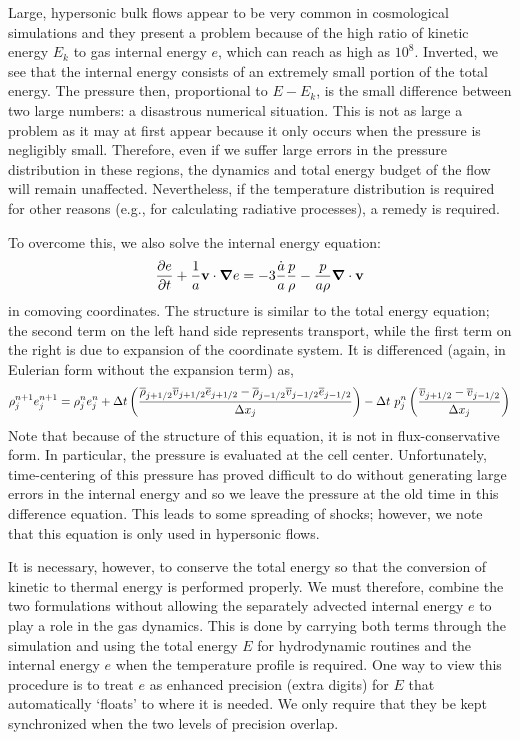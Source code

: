 Large, hypersonic bulk flows appear to be very common in cosmological
simulations and they present a problem because of the high ratio of
kinetic energy $E_k$ to gas internal energy $e$, which can reach as
high as $10^8$.  Inverted, we see that the internal energy consists of
an extremely small portion of the total energy.  The pressure then,
proportional to $E - E_{k}$, is the small difference between two large
numbers: a disastrous numerical situation.  This is not as large a
problem as it may at first appear because it only occurs when the
pressure is negligibly small.  Therefore, even if we suffer large
errors in the pressure distribution in these regions, the dynamics and
total energy budget of the flow will remain unaffected.  Nevertheless,
if the temperature distribution is required for other reasons
(e.g., for calculating radiative processes), a remedy is required.

To overcome this, we also solve the internal energy equation:
\begin{equation}
 \frac{\partial e}{\partial t} 
           + \frac{1}{a} \vecv \cdot \grad e
         = - 3 \frac{\dot{a}}{a} \frac{p}{\rho}
           - \frac{p}{a\rho} \div \vecv
\end{equation}
in comoving coordinates.  The structure is similar to the total energy
equation; the second term on the left hand side represents transport, while
the first term on the right is due to expansion of the coordinate
system.  
It is differenced (again, in Eulerian form without the expansion term) as,
%
\begin{equation}
\rho_j^{n+1} e_j^{n+1}  = 
       \rho_j^n e_j^n   +  \Delta t  \left(
            \frac{  \avp{\rho} \avp{v} \avp{e}  - \avm{\rho} \avm{v} \avm{e}} {\Delta x_j} \right)
            - \Delta t \ p_j^{n} \left( \frac{ \avp{v} - \avm{v}} {\Delta x_j} 
                      \right)
                  \label{eq:gasenergy_diff}
\end{equation}
%
Note that because of the structure of this equation, it is not in
flux-conservative form.  In particular, the pressure is evaluated at
the cell center.  Unfortunately, time-centering of this pressure has
proved difficult to do without generating large errors in the internal
energy and so we leave the pressure at the old time in
this difference equation.  This leads to some spreading of shocks; however,
we note that this equation is only used in hypersonic flows.

It is necessary, however, to conserve the total energy so that the conversion
of kinetic to thermal energy is performed properly.   We must therefore,
combine the two formulations without allowing the separately advected
internal energy $e$ to play a role in the gas dynamics.  This is done by
carrying both terms through the simulation and using
the total energy $E$ for hydrodynamic routines and the internal energy
$e$ when the temperature profile is required.  One way to view this procedure
is to treat $e$ as enhanced precision (extra digits) for $E$ that automatically
`floats' to where it is needed.
We only require that they be kept synchronized when the two levels of precision
overlap.

